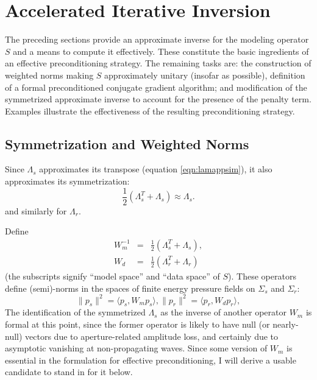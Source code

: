 \documentclass[12pt]{geophysics}
\begin{document}
\section{Accelerated Iterative Inversion}

The preceding sections provide an approximate inverse for the modeling
operator $S$ and a means to compute it effectively. These constitute
the basic ingredients of an effective preconditioning strategy. The
remaining tasks are: the construction of weighted norms making $S$
approximately unitary (insofar as possible), definition of a formal
preconditioned conjugate gradient algorithm; and modification of the
symmetrized approximate inverse to account for the presence of the
penalty term. Examples illustrate the effectiveness of the resulting
preconditioning strategy.

\subsection{Symmetrization and Weighted Norms}
Since $\Lambda_s$ approximates its transpose (equation \ref{eqn:lamappsim}), it also approximates its
 symmetrization:
\begin{equation}
  \label{eqn:lamsymm}
  \frac{1}{2}(\Lambda_s^T+\Lambda_s) \approx \Lambda_s.
\end{equation}
and similarly for $\Lambda_r$.

Define
\begin{eqnarray}
  W_m^{-1}&=& \frac{1}{2}(\Lambda_s^T+
              \Lambda_s),\nonumber \\
  W_d &=& \frac{1}{2}(\Lambda_r^T+ \Lambda_r)
          \label{eqn:wdef}
\end{eqnarray}
(the subscripts signify ``model space'' and ``data space'' of $S$).
These operators define (semi)-norms in the spaces of finite energy
pressure fields on $\Sigma_s$ and $\Sigma_r$:
\[
  \|p_s\|^2 = \langle p_s, W_m p_s\rangle,  \|p_r\|^2 = \langle p_r,
  W_d p_r\rangle,
\] 
The identification of the symmetrized $\Lambda_s$ as the inverse
of another operator $W_m$ is formal at this point, since the former operator is
likely to have null (or nearly-null) vectors due to aperture-related
amplitude loss, and certainly due to asymptotic vanishing at
non-propagating waves. Since some version of $W_m$ is essential in the
formulation for effective preconditioning, I will derive a usable
candidate to stand in for it below.
\end{document}
